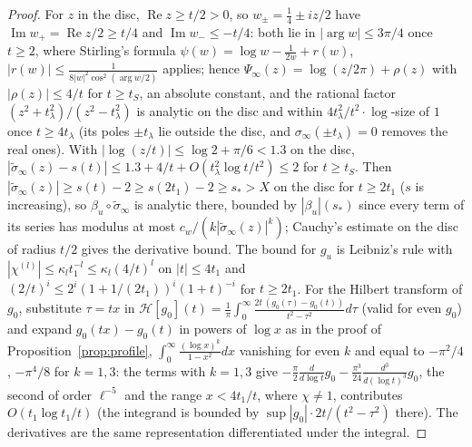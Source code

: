\documentclass[11pt]{article}
\theoremstyle{definition}
\theoremstyle{remark}
\DeclareMathOperator{\Ree}{Re}
\DeclareMathOperator{\Imm}{Im}
\begin{document}
\begin{proof}
For $z$ in the disc, $\Ree z\ge t/2>0$, so $w_\pm=\tfrac14\pm iz/2$ have $\Imm w_+=\Ree z/2\ge t/4$ and $\Imm w_-\le-t/4$: both lie in $|\arg w|\le3\pi/4$ once $t\ge2$, where Stirling's formula $\psi(w)=\log w-\frac1{2w}+r(w)$, $|r(w)|\le\frac{1}{8|w|^2\cos^2(\arg w/2)}$ \cite[5.11.ii]{dlmf} applies; hence $\Psi_\infty(z)=\log(z/2\pi)+\rho(z)$ with $|\rho(z)|\le4/t$ for $t\ge t_S$, an absolute constant, and the rational factor $(z^2+t_\lambda^2)/(z^2-t_\lambda^2)$ is analytic on the disc and within $4t_\lambda^2/t^2\cdot\log$-size of $1$ once $t\ge4t_\lambda$ (its poles $\pm t_\lambda$ lie outside the disc, and $\sigma_\infty(\pm t_\lambda)=0$ removes the real ones). With $|\log(z/t)|\le\log2+\pi/6<1.3$ on the disc, $|\tilde\sigma_\infty(z)-s(t)|\le1.3+4/t+O(t_\lambda^2\log t/t^2)\le2$ for $t\ge t_S$. Then $|\tilde\sigma_\infty(z)|\ge s(t)-2\ge s(2t_1)-2\ge s_*>X$ on the disc for $t\ge2t_1$ ($s$ is increasing), so $\beta_u\circ\tilde\sigma_\infty$ is analytic there, bounded by $|\beta_u|(s_*)$ since every term of its series has modulus at most $c_w/(k|\tilde\sigma_\infty(z)|^k)$; Cauchy's estimate on the disc of radius $t/2$ gives the derivative bound. The bound for $g_u$ is Leibniz's rule with $|\chi^{(l)}|\le\kappa_lt_1^{-l}\le\kappa_l(4/t)^l$ on $|t|\le4t_1$ and $(2/t)^i\le2^i(1+1/(2t_1))^i(1+t)^{-i}$ for $t\ge2t_1$. For the Hilbert transform of $g_0$, substitute $\tau=tx$ in $\mathcal H[g_0](t)=\frac1\pi\int_0^\infty\frac{2t\,(g_0(\tau)-g_0(t))}{t^2-\tau^2}d\tau$ (valid for even $g_0$) and expand $g_0(tx)-g_0(t)$ in powers of $\log x$ as in the proof of Proposition~\ref{prop:profile}, $\int_0^\infty\frac{(\log x)^k}{1-x^2}dx$ vanishing for even $k$ and equal to $-\pi^2/4$, $-\pi^4/8$ for $k=1,3$: the terms with $k=1,3$ give $-\frac\pi2\frac{d}{d\log t}g_0-\frac{\pi^3}{24}\frac{d^3}{d(\log t)^3}g_0$, the second of order $\ell^{-5}$ and the range $x<4t_1/t$, where $\chi\ne1$, contributes $O(t_1\log t_1/t)$ (the integrand is bounded by $\sup|g_0|\cdot2t/(t^2-\tau^2)$ there). The derivatives are the same representation differentiated under the integral.
\end{proof}
\end{document}
